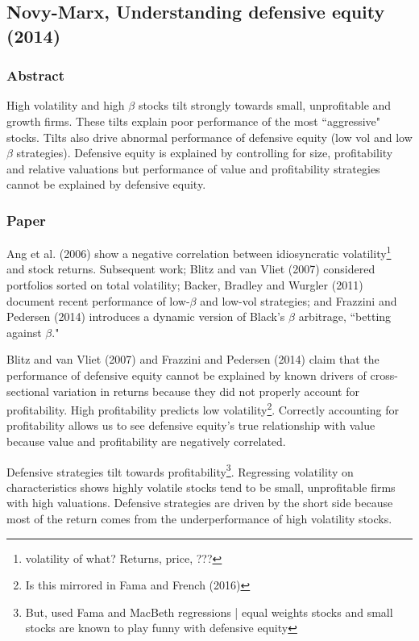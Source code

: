 \subsection[Novy-Marx, 2014]{Novy-Marx, Understanding defensive equity (2014)\cite{novy2014understanding}}

\subsubsection{Abstract}

High volatility and high $\beta$ stocks tilt strongly towards small, unprofitable and
growth firms. These tilts explain poor performance of the most ``aggressive" stocks. Tilts
also drive abnormal performance of defensive equity (low vol and low $\beta$ strategies).
Defensive equity is explained by controlling for size, profitability and relative
valuations but performance of value and profitability strategies cannot be explained by
defensive equity.

\subsubsection{Paper}

Ang et al. (2006)\cite{ang2006cross} show a negative correlation between idiosyncratic
volatility\footnote{volatility of what? Returns, price, ???} and stock returns. Subsequent
work; Blitz and van Vliet (2007)\cite{blitz2007volatility} considered portfolios sorted on
total volatility; Backer, Bradley and Wurgler (2011)\cite{backer2011benchmarks} document
recent performance of low-$\beta$ and low-vol strategies; and Frazzini and Pedersen
(2014)\cite{frazzini2014betting} introduces a dynamic version of Black's $\beta$
arbitrage, ``betting against $\beta$."

Blitz and van Vliet (2007) and Frazzini and Pedersen (2014) claim that the performance of
defensive equity cannot be explained by known drivers of cross-sectional variation in
returns because they did not properly account for profitability. High profitability
predicts low volatility\footnote{Is this mirrored in Fama and French (2016)}. Correctly
accounting for profitability allows us to see defensive equity's true relationship with
value because value and profitability are negatively correlated.

Defensive strategies tilt towards profitability\footnote{But, used Fama and MacBeth
regressions | equal weights stocks and small stocks are known to play funny with defensive
equity}. Regressing volatility on characteristics shows highly volatile stocks tend to be
small, unprofitable firms with high valuations. Defensive strategies are driven by the
short side because most of the return comes from the underperformance of high volatility
stocks.

